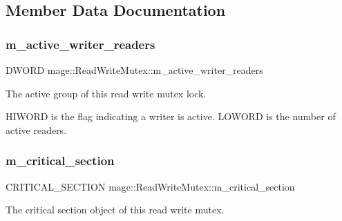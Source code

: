 \subsection{Member Data Documentation}
\hypertarget{classmage_1_1_read_write_mutex_a1e0ad98e517236170faae5b27decfdce}{}\label{classmage_1_1_read_write_mutex_a1e0ad98e517236170faae5b27decfdce} 
\subsubsection{\texorpdfstring{m\+\_\+active\+\_\+writer\+\_\+readers}{m\_active\_writer\_readers}}
{\footnotesize\ttfamily D\+W\+O\+RD mage\+::\+Read\+Write\+Mutex\+::m\+\_\+active\+\_\+writer\+\_\+readers\hspace{0.3cm}{\ttfamily [private]}}

The active group of this read write mutex lock.

H\+I\+W\+O\+RD is the flag indicating a writer is active. L\+O\+W\+O\+RD is the number of active readers. \hypertarget{classmage_1_1_read_write_mutex_a77fe51b87e5205d60ea045fa53bc1fa3}{}\label{classmage_1_1_read_write_mutex_a77fe51b87e5205d60ea045fa53bc1fa3} 
\subsubsection{\texorpdfstring{m\+\_\+critical\+\_\+section}{m\_critical\_section}}
{\footnotesize\ttfamily C\+R\+I\+T\+I\+C\+A\+L\+\_\+\+S\+E\+C\+T\+I\+ON mage\+::\+Read\+Write\+Mutex\+::m\+\_\+critical\+\_\+section\hspace{0.3cm}{\ttfamily [private]}}

The critical section object of this read write mutex. \hypertarget{classmage_1_1_read_write_mutex_acbe7553fff7cca2656f6f2b8f0471484}{}\label{classmage_1_1_read_write_mutex_acbe7553fff7cca2656f6f2b8f0471484} 
